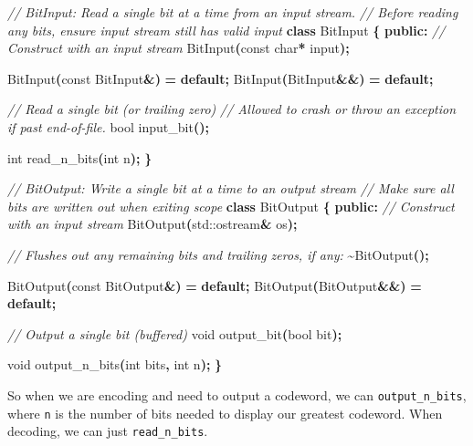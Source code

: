 \documentclass[12pt,twoside]{reedthesis}
\newenvironment{Shaded}{\begin{snugshade}}{\end{snugshade}}
\newcommand{\AttributeTok}[1]{\textcolor[rgb]{0.77,0.63,0.00}{#1}}
\newcommand{\BuiltInTok}[1]{#1}
\newcommand{\CommentTok}[1]{\textcolor[rgb]{0.56,0.35,0.01}{\textit{#1}}}
\newcommand{\ControlFlowTok}[1]{\textcolor[rgb]{0.13,0.29,0.53}{\textbf{#1}}}
\newcommand{\DataTypeTok}[1]{\textcolor[rgb]{0.13,0.29,0.53}{#1}}
\newcommand{\KeywordTok}[1]{\textcolor[rgb]{0.13,0.29,0.53}{\textbf{#1}}}
\newcommand{\NormalTok}[1]{#1}
\newcommand{\OperatorTok}[1]{\textcolor[rgb]{0.81,0.36,0.00}{\textbf{#1}}}
\begin{document}
\begin{Shaded}
\begin{Highlighting}[]
\CommentTok{// BitInput: Read a single bit at a time from an input stream.}
\CommentTok{// Before reading any bits, ensure input stream still has valid input}
\KeywordTok{class}\NormalTok{ BitInput }\OperatorTok{\{}
 \KeywordTok{public}\OperatorTok{:}
  \CommentTok{// Construct with an input stream}
\NormalTok{  BitInput}\OperatorTok{(}\AttributeTok{const} \DataTypeTok{char}\OperatorTok{*}\NormalTok{ input}\OperatorTok{);}

\NormalTok{  BitInput}\OperatorTok{(}\AttributeTok{const}\NormalTok{ BitInput}\OperatorTok{\&)} \OperatorTok{=} \ControlFlowTok{default}\OperatorTok{;}
\NormalTok{  BitInput}\OperatorTok{(}\NormalTok{BitInput}\OperatorTok{\&\&)} \OperatorTok{=} \ControlFlowTok{default}\OperatorTok{;}

  \CommentTok{// Read a single bit (or trailing zero)}
  \CommentTok{// Allowed to crash or throw an exception if past end{-}of{-}file.}
  \DataTypeTok{bool}\NormalTok{ input\_bit}\OperatorTok{();}

  \DataTypeTok{int}\NormalTok{ read\_n\_bits}\OperatorTok{(}\DataTypeTok{int}\NormalTok{ n}\OperatorTok{);}
\OperatorTok{\}}

\CommentTok{// BitOutput: Write a single bit at a time to an output stream}
\CommentTok{// Make sure all bits are written out when exiting scope}
\KeywordTok{class}\NormalTok{ BitOutput }\OperatorTok{\{}
 \KeywordTok{public}\OperatorTok{:}
  \CommentTok{// Construct with an input stream}
\NormalTok{  BitOutput}\OperatorTok{(}\BuiltInTok{std::}\NormalTok{ostream}\OperatorTok{\&}\NormalTok{ os}\OperatorTok{);}

  \CommentTok{// Flushes out any remaining bits and trailing zeros, if any:}
  \OperatorTok{\textasciitilde{}}\NormalTok{BitOutput}\OperatorTok{();}

\NormalTok{  BitOutput}\OperatorTok{(}\AttributeTok{const}\NormalTok{ BitOutput}\OperatorTok{\&)} \OperatorTok{=} \ControlFlowTok{default}\OperatorTok{;}
\NormalTok{  BitOutput}\OperatorTok{(}\NormalTok{BitOutput}\OperatorTok{\&\&)} \OperatorTok{=} \ControlFlowTok{default}\OperatorTok{;}

  \CommentTok{// Output a single bit (buffered)}
  \DataTypeTok{void}\NormalTok{ output\_bit}\OperatorTok{(}\DataTypeTok{bool}\NormalTok{ bit}\OperatorTok{);}

  \DataTypeTok{void}\NormalTok{ output\_n\_bits}\OperatorTok{(}\DataTypeTok{int}\NormalTok{ bits}\OperatorTok{,} \DataTypeTok{int}\NormalTok{ n}\OperatorTok{);}
\OperatorTok{\}}
\end{Highlighting}
\end{Shaded}
So when we are encoding and need to output a codeword, we can \texttt{output\_n\_bits}, where \texttt{n} is the number of bits needed to display our greatest codeword. When decoding, we can just \texttt{read\_n\_bits}.
\end{document}
